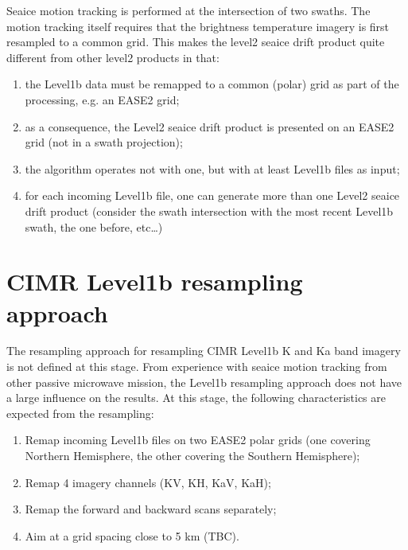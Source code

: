 \documentclass[letterpaper,10pt,english]{jupyterBook}
\begin{document}
\sphinxAtStartPar
Sea\sphinxhyphen{}ice motion tracking is performed at the intersection of two swaths. The motion tracking itself requires that the brightness temperature imagery
is first resampled to a common grid. This makes the level\sphinxhyphen{}2 sea\sphinxhyphen{}ice drift product quite different from other level\sphinxhyphen{}2 products in that:
\begin{enumerate}
%
\item {} 
\sphinxAtStartPar
the Level\sphinxhyphen{}1b data must be remapped to a common (polar) grid as part of the processing, e.g. an EASE2 grid;

\item {} 
\sphinxAtStartPar
as a consequence, the Level\sphinxhyphen{}2 sea\sphinxhyphen{}ice drift product is presented on an EASE2 grid (not in a swath projection);

\item {} 
\sphinxAtStartPar
the algorithm operates not with one, but with at least  Level\sphinxhyphen{}1b files as input;

\item {} 
\sphinxAtStartPar
for each incoming Level\sphinxhyphen{}1b file, one can generate more than one Level\sphinxhyphen{}2 sea\sphinxhyphen{}ice drift product (consider the swath intersection with the most recent Level\sphinxhyphen{}1b swath, the one before, etc…)

\end{enumerate}


\section{CIMR Level\sphinxhyphen{}1b re\sphinxhyphen{}sampling approach}
\label{\detokenize{baseline_algorithm_definition:cimr-level-1b-re-sampling-approach}}
\sphinxAtStartPar
The re\sphinxhyphen{}sampling approach for resampling CIMR Level\sphinxhyphen{}1b K and Ka band imagery is not defined at this stage. From experience with sea\sphinxhyphen{}ice motion tracking from other passive
microwave mission, the Level\sphinxhyphen{}1b re\sphinxhyphen{}sampling approach does not have a large influence on the results. At this stage, the following characteristics are expected from the
re\sphinxhyphen{}sampling:
\begin{enumerate}
%
\item {} 
\sphinxAtStartPar
Remap incoming Level\sphinxhyphen{}1b files on two EASE2 polar grids (one covering Northern Hemisphere, the other covering the Southern Hemisphere);

\item {} 
\sphinxAtStartPar
Remap 4 imagery channels (K\sphinxhyphen{}V, K\sphinxhyphen{}H, Ka\sphinxhyphen{}V, Ka\sphinxhyphen{}H);

\item {} 
\sphinxAtStartPar
Remap the forward and backward scans separately;

\item {} 
\sphinxAtStartPar
Aim at a grid spacing close to 5 km (TBC).

\end{enumerate}
\end{document}
